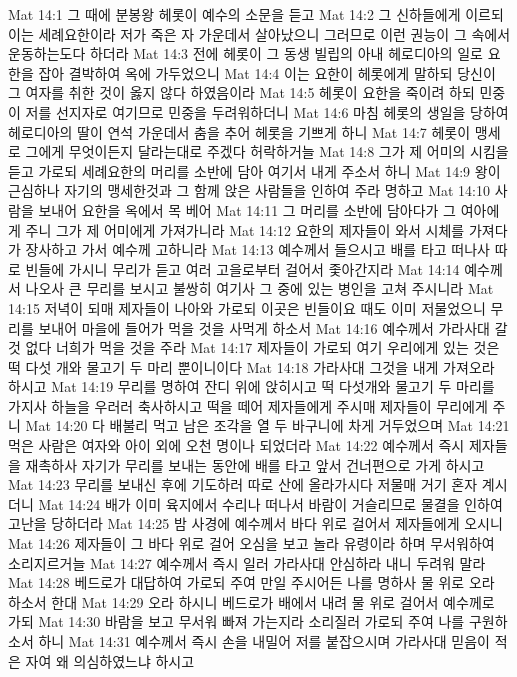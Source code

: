 Mat 14:1  그 때에 분봉왕 헤롯이 예수의 소문을 듣고
Mat 14:2  그 신하들에게 이르되 이는 세례요한이라 저가 죽은 자 가운데서 살아났으니 그러므로 이런 권능이 그 속에서 운동하는도다 하더라
Mat 14:3  전에 헤롯이 그 동생 빌립의 아내 헤로디아의 일로 요한을 잡아 결박하여 옥에 가두었으니
Mat 14:4  이는 요한이 헤롯에게 말하되 당신이 그 여자를 취한 것이 옳지 않다 하였음이라
Mat 14:5  헤롯이 요한을 죽이려 하되 민중이 저를 선지자로 여기므로 민중을 두려워하더니
Mat 14:6  마침 헤롯의 생일을 당하여 헤로디아의 딸이 연석 가운데서 춤을 추어 헤롯을 기쁘게 하니
Mat 14:7  헤롯이 맹세로 그에게 무엇이든지 달라는대로 주겠다 허락하거늘
Mat 14:8  그가 제 어미의 시킴을 듣고 가로되 세례요한의 머리를 소반에 담아 여기서 내게 주소서 하니
Mat 14:9  왕이 근심하나 자기의 맹세한것과 그 함께 앉은 사람들을 인하여 주라 명하고
Mat 14:10  사람을 보내어 요한을 옥에서 목 베어
Mat 14:11  그 머리를 소반에 담아다가 그 여아에게 주니 그가 제 어미에게 가져가니라
Mat 14:12  요한의 제자들이 와서 시체를 가져다가 장사하고 가서 예수께 고하니라
Mat 14:13  예수께서 들으시고 배를 타고 떠나사 따로 빈들에 가시니 무리가 듣고 여러 고을로부터 걸어서 좇아간지라
Mat 14:14  예수께서 나오사 큰 무리를 보시고 불쌍히 여기사 그 중에 있는 병인을 고쳐 주시니라
Mat 14:15  저녁이 되매 제자들이 나아와 가로되 이곳은 빈들이요 때도 이미 저물었으니 무리를 보내어 마을에 들어가 먹을 것을 사먹게 하소서
Mat 14:16  예수께서 가라사대 갈것 없다 너희가 먹을 것을 주라
Mat 14:17  제자들이 가로되 여기 우리에게 있는 것은 떡 다섯 개와 물고기 두 마리 뿐이니이다
Mat 14:18  가라사대 그것을 내게 가져오라 하시고
Mat 14:19  무리를 명하여 잔디 위에 앉히시고 떡 다섯개와 물고기 두 마리를 가지사 하늘을 우러러 축사하시고 떡을 떼어 제자들에게 주시매 제자들이 무리에게 주니
Mat 14:20  다 배불리 먹고 남은 조각을 열 두 바구니에 차게 거두었으며
Mat 14:21  먹은 사람은 여자와 아이 외에 오천 명이나 되었더라
Mat 14:22  예수께서 즉시 제자들을 재촉하사 자기가 무리를 보내는 동안에 배를 타고 앞서 건너편으로 가게 하시고
Mat 14:23  무리를 보내신 후에 기도하러 따로 산에 올라가시다 저물매 거기 혼자 계시더니
Mat 14:24  배가 이미 육지에서 수리나 떠나서 바람이 거슬리므로 물결을 인하여 고난을 당하더라
Mat 14:25  밤 사경에 예수께서 바다 위로 걸어서 제자들에게 오시니
Mat 14:26  제자들이 그 바다 위로 걸어 오심을 보고 놀라 유령이라 하며 무서워하여 소리지르거늘
Mat 14:27  예수께서 즉시 일러 가라사대 안심하라 내니 두려워 말라
Mat 14:28  베드로가 대답하여 가로되 주여 만일 주시어든 나를 명하사 물 위로 오라 하소서 한대
Mat 14:29  오라 하시니 베드로가 배에서 내려 물 위로 걸어서 예수께로 가되
Mat 14:30  바람을 보고 무서워 빠져 가는지라 소리질러 가로되 주여 나를 구원하소서 하니
Mat 14:31  예수께서 즉시 손을 내밀어 저를 붙잡으시며 가라사대 믿음이 적은 자여 왜 의심하였느냐 하시고
